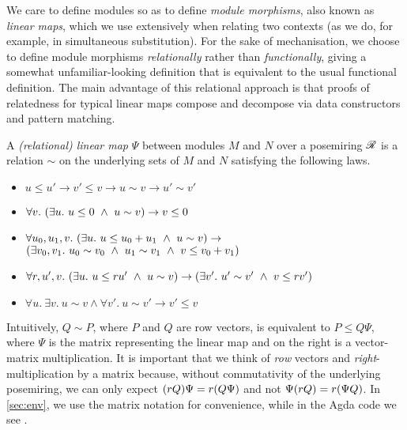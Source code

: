 We care to define modules so as to define \emph{module morphisms}, also known
as \emph{linear maps}, which we use extensively when relating two contexts (as
we do, for example, in simultaneous substitution).
For the sake of mechanisation, we choose to define module morphisms
\emph{relationally} rather than \emph{functionally}, giving a somewhat
unfamiliar-looking definition that is equivalent to the usual functional
definition.
The main advantage of this relational approach is that proofs of relatedness
for typical linear maps compose and decompose via data constructors and
pattern matching.

\begin{definition}
  A \emph{(relational) linear map} $\Psi$ between modules $M$ and $N$ over a
  posemiring $\mathscr R$ is a relation $\sim$ on the underlying sets of $M$ and $N$
  satisfying the following laws.
  \begin{itemize}
    \item $u \leq u' \to v' \leq v \to u \sim v \to u' \sim v'$
    \item $\forall v.~\plr{\exists u.~u \leq 0 \land u \sim v} \to v \leq 0$
    \item $\forall u_0,u_1,v.~\plr{\exists u.~u \leq u_0 + u_1 \land u \sim v}
      \to {}$\\$\plr{\exists v_0,v_1.~u_0 \sim v_0
      \land u_1 \sim v_1 \land v \leq v_0 + v_1}$
    \item $\forall r,u',v.~\plr{\exists u.~u \leq ru' \land u \sim v} \to
      \plr{\exists v'.~u' \sim v' \land v \leq rv'}$
    \item
      $\forall u.~\exists v.~u \sim v \land \forall v'.~u \sim v' \to v' \leq v$
  \end{itemize}
\end{definition}

Intuitively, $Q \sim P$, where $P$ and $Q$ are row vectors, is equivalent to
$P \leq Q\Psi$, where $\Psi$ is the matrix representing the linear map and on
the right is a vector-matrix multiplication.
It is important that we think of \emph{row} vectors and
\emph{right}-multiplication by a matrix because, without commutativity of the
underlying posemiring, we can only expect $\plr{rQ}\Psi = r\plr{Q\Psi}$ and
not $\Psi\plr{rQ} = r\plr{\Psi Q}$.
In \cref{sec:env}, we use the matrix notation for convenience, while in the
Agda code we see .

